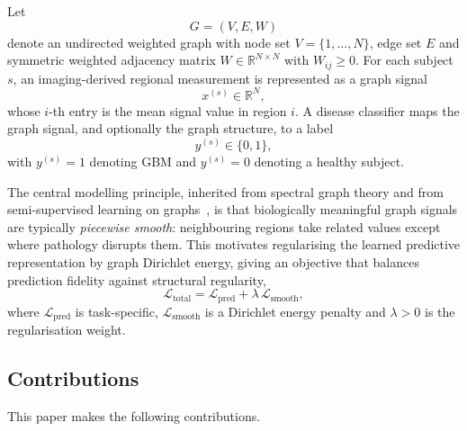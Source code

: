 \documentclass[11pt,reqno]{amsart}
\theoremstyle{plain}
\theoremstyle{definition}
\theoremstyle{remark}
\numberwithin{equation}{section}
\newcommand{\R}{\mathbb{R}}
\newcommand{\Lpred}{\mathcal{L}_{\mathrm{pred}}}
\newcommand{\Lsmooth}{\mathcal{L}_{\mathrm{smooth}}}
\newcommand{\Ltotal}{\mathcal{L}_{\mathrm{total}}}
\begin{document}
Let
\[
G = (V,E,W)
\]
denote an undirected weighted graph with node set $V=\{1,\dots,N\}$, edge set
$E$ and symmetric weighted adjacency matrix $W \in \R^{N\times N}$ with
$W_{ij}\ge 0$. For each subject $s$, an imaging-derived regional measurement is
represented as a graph signal
\[
x^{(s)} \in \R^{N},
\]
whose $i$-th entry is the mean signal value in region $i$. A disease classifier
maps the graph signal, and optionally the graph structure, to a label
\[
y^{(s)} \in \{0,1\},
\]
with $y^{(s)}=1$ denoting GBM and $y^{(s)}=0$ denoting a healthy subject.

The central modelling principle, inherited from spectral graph theory and from
semi-supervised learning on graphs~\cite{zhou2004learning,belkin2003laplacian,
vonluxburg2007tutorial}, is that biologically meaningful graph signals are
typically \emph{piecewise smooth}: neighbouring regions take related values
except where pathology disrupts them. This motivates regularising the learned
predictive representation by graph Dirichlet energy, giving an objective that
balances prediction fidelity against structural regularity,
\begin{equation}
\label{eq:main_objective_intro}
\Ltotal = \Lpred + \lambda\,\Lsmooth ,
\end{equation}
where $\Lpred$ is task-specific, $\Lsmooth$ is a Dirichlet energy penalty and
$\lambda>0$ is the regularisation weight.

\subsection{Contributions}

This paper makes the following contributions.
\end{document}
